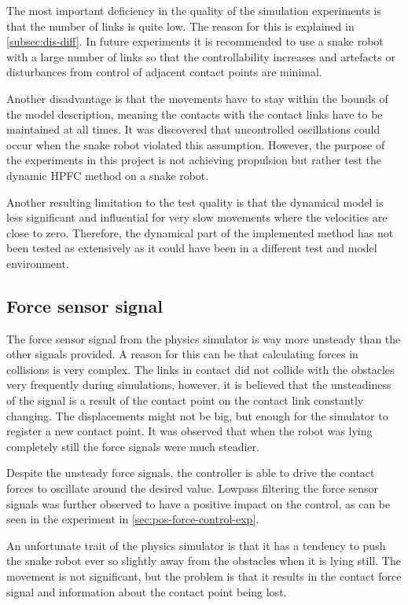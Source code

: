 The most important deficiency in the quality of the simulation experiments is that the number of links is quite low. The reason for this is explained in \ref{subsec:dis-diff}. In future experiments it is recommended to use a snake robot with a large number of links so that the controllability increases and artefacts or disturbances from control of adjacent contact points are minimal.

Another disadvantage is that the movements have to stay within the bounds of the model description, meaning the contacts with the contact links have to be maintained at all times. It was discovered that uncontrolled oscillations could occur when the snake robot violated this assumption. However, the purpose of the experiments in this project is not achieving propulsion but rather test the dynamic HPFC method on a snake robot.

Another resulting limitation to the test quality is that the dynamical model is less significant and influential for very slow movements where the velocities are close to zero. Therefore, the dynamical part of the implemented method has not been tested as extensively as it could have been in a different test and model environment.

\subsection{Force sensor signal}

The force sensor signal from the physics simulator is way more unsteady than the other signals provided. A reason for this can be that calculating forces in collisions is very complex. The links in contact did not collide with the obstacles very frequently during simulations, however, it is believed that the unsteadiness of the signal is a result of the contact point on the contact link constantly changing. The displacements might not be big, but enough for the simulator to register a new contact point. It was observed that when the robot was lying completely still the force signals were much steadier.

Despite the unsteady force signals, the controller is able to drive the contact forces to oscillate around the desired value. Lowpass filtering the force sensor signals was further observed to have a positive impact on the control, as can be seen in the experiment in \ref{sec:pos-force-control-exp}.

An unfortunate trait of the physics simulator is that it has a tendency to push the snake robot ever so slightly away from the obstacles when it is lying still. The movement is not significant, but the problem is that it results in the contact force signal and information about the contact point being lost.

